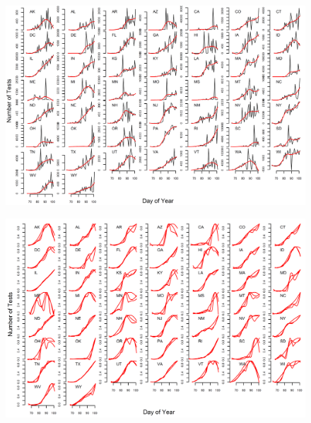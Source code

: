 \documentclass[11pt]{article}
\begin{document}
\begin{figure}
\centering
\hspace*{0cm}\includegraphics[width=16cm]{number_of_tests_span06.png}
\caption{}
\label{fig:bends}
\end{figure} 

\begin{figure}
\centering
\hspace*{0cm}\includegraphics[width=16cm]{number_of_tests_factor_04_06_10.png}
\caption{}
\label{fig:bends}
\end{figure} 
\end{document}
